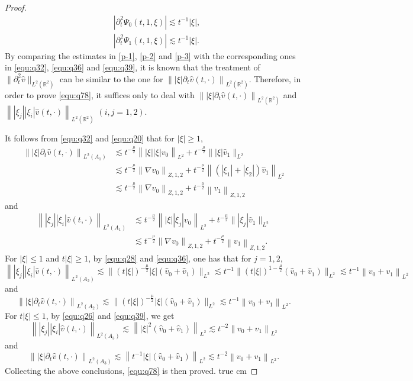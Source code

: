 \documentclass[11pt,twoside]{article}
\newcommand{\R}{\mathbb R}
\newcommand{\p}{\partial}
\newcommand{\f}{\frac}
\theoremstyle{plain}
\theoremstyle{definition}
\theoremstyle{remark}
\numberwithin{equation}{section}
\begin{document}
\begin{proof}
\begin{equation}
\begin{aligned}
& \left|\p_t^2\Psi_0(t, 1,\xi)\right| \lesssim t^{-1}|\xi|, \\
& \left|\p_t^2\Psi_1(t, 1, \xi)\right|  \lesssim t^{-1}|\xi|.
\end{aligned}
\end{equation}
By comparing the estimates in \eqref{p-1}, \eqref{p-2} and \eqref{p-3} with the corresponding ones in \eqref{equ:q32}, \eqref{equ:q36} and \eqref{equ:q39},
it is known that the treatment of $\|\p_t^2\hat{v}\|_{L^2(\R^2)}$ can be similar to the one for $\left\||\xi|\p_t\hat{v}(t, \cdot)\right\|_{L^2(\R^2)}$. Therefore, in order to prove  \eqref{equ:q78}, it suffices only to deal with $\left\||\xi|\p_t\hat{v}(t, \cdot)\right\|_{L^2(\R^2)}$ and $\left\||\xi_j||\xi_i|\hat{v}(t, \cdot)\right\|_{L^2(\R^2)}$ $(i, j=1, 2)$.

It follows from  \eqref{equ:q32} and \eqref{equ:q20} that for $|\xi|\geq 1$,
$$
\begin{aligned}
\left\||\xi|\p_t\hat{v}(t, \cdot)\right\|_{L^2(A_1)}
& \lesssim t^{-\frac{\mu}{2}}\left\||\xi||\xi|\hat{v_{0}}\right\|_{L^{2}}+t^{-\f{\mu}{2}} \||\xi|\hat{v}_{1}\|_{L^{2}}\\
& \lesssim t^{-\frac{\mu}{2}}\left\|\nabla v_{0}\right\|_{Z, 1, 2}+t^{-\f{\mu}{2}}\left\|(|\xi_1|+|\xi_2|)\hat{v}_1\right\|_{L^2}\\
& \lesssim t^{-\f{\mu}{2}}\left\|\nabla v_0\right\|_{Z, 1, 2}+t^{-\f{\mu}{2}}\left\|v_1\right\|_{Z, 1,2}
\end{aligned}
$$
and
$$
\begin{aligned}
\left\||\xi_j||\xi_i|\hat{v}(t, \cdot)\right\|_{L^2(A_1)}
& \lesssim t^{-\frac{\mu}{2}}\left\||\xi||\xi_j|v_{0}\right\|_{L^{2}}+t^{-\f{\mu}{2}} \||\xi_j|\hat{v}_{1}\|_{L^{2}}\\
& \lesssim t^{-\f{\mu}{2}}\left\|\nabla v_0\right\|_{Z, 1, 2}+t^{-\f{\mu}{2}}\left\|v_1\right\|_{Z,1,2}.
\end{aligned}
$$
For $|\xi|\leq1$ and $t|\xi|\geq1$, by \eqref{equ:q28} and \eqref{equ:q36}, one has that for $j=1, 2$,
$$
\left\||\xi_j||\xi_i|\hat{v}(t, \cdot)\right\|_{L^2(A_2)}\lesssim \big\|(t|\xi|)^{-\f{\mu}{2}}|\xi|(\hat{v}_{0}+\hat{v}_{1})\big\|_{L^{2}}
\lesssim t^{-1} \big\|(t|\xi|)^{1-\f{\mu}{2}}(\hat{v}_{0}+\hat{v}_{1})\big\|_{L^{2}} \lesssim t^{-1}\left\|v_0+v_1\right\|_{L^ 2}
$$
and
$$
\left\||\xi|\p_t\hat{v}(t, \cdot)\right\|_{L^2(A_2)}\lesssim \big\|(t|\xi|)^{-\f{\mu}{2}}|\xi|(\hat{v}_{0}+\hat{v}_{1})\big\|_{L^{2}} \lesssim t^{-1}\left\|v_0+v_1\right\|_{L^ 2}.
$$
For $t|\xi|\leq1$, by \eqref{equ:q26} and \eqref{equ:q39}, we get
$$
\left\||\xi_j||\xi_i|\hat{v}(t, \cdot)\right\|_{L^2(A_3)}\lesssim \left\||\xi|^2(\hat{v}_{0}+\hat{v}_{1})\right\|_{L^{2}} \lesssim t^{-2}\left\|v_0+v_1\right\|_{L^ 2}
$$
and
$$
\left\||\xi|\p_t\hat{v}(t, \cdot)\right\|_{L^2(A_3)}\lesssim \left\|t^{-1}|\xi|(\hat{v}_{0}+\hat{v}_{1})\right\|_{L^{2}} \lesssim t^{-2}\left\|v_0+v_1\right\|_{L^ 2}.
$$
Collecting the above conclusions, \eqref{equ:q78} is then proved.
 true cm


\end{proof}
\end{document}
